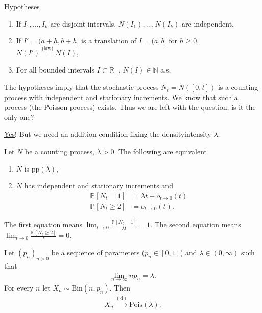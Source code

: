 \underline{Hypotheses} 
\begin{enumerate}
	\item If $I_1,\ldots ,I_k$ are disjoint intervals, $N(I_1),\ldots,N(I_k)$ are independent,   
	\item If $I'=(a+h,b+h]$ is a translation of $I=(a,b]$ for $h\geq 0$, $N(I') \stackrel{ \textrm{(law)} }{=}N(I)$,
	\item For all bounded intervals $I\subset \mathbb{R}_+$, $N(I)\in \mathbb{N}$ a.s.
\end{enumerate}
The hypotheses imply that the stochastic process $N_t=N([0,t])$ is a counting process with independent and stationary increments. We know that such a process (the Poisson process) exists. Thus we are left with the question, is it the only one?

\underline{Yes}! But we need an addition condition fixing the {\color{blue}\st{density}intensity} $\lambda $.
\begin{theorem}[]
	Let $N$ be a counting process, $\lambda> 0$. The following are equivalent
\begin{enumerate}
	\item $N$ is $ \textrm{pp} (\lambda)$, 
	\item $N$ has independent and stationary increments and 
		\begin{align}
			\mathbb{P}_{} \left[ N_t =1 \right] &= \lambda t + o_{t\to 0}(t) \\
			\mathbb{P}_{} \left[ N_t \geq 2 \right] &= o_{t \to 0}(t).
		\end{align}
\end{enumerate}
\end{theorem}
\begin{rmk}[]
	The first equation means $\lim_{t\to0}\frac{\mathbb{P}_{} \left[ N_t =1 \right] }{\lambda t}=1$. The second equation means $\lim_{t\to 0} \frac{\mathbb{P}_{} \left[ N_t \geq 2 \right] }{t}=0$.
\end{rmk}
\begin{lemma}[]
	Let $(p_n)_{n> 0}$ be a sequence of parameters ($p_{n}\in [0,1]$) and $\lambda \in (0, \infty )$ such that
	\begin{align}
		\lim_{n\to \infty }np_n = \lambda .
	\end{align}
	For every $n$ let $X_n \sim  \textrm{Bin}(n,p_n) $. Then
	\begin{align}
		X_n \stackrel{ (\textrm{d}) }{\longrightarrow } \textrm{Pois} (\lambda ).
	\end{align}
\end{lemma}
